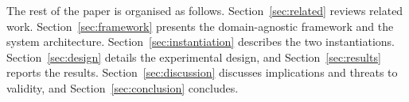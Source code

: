 The rest of the paper is organised as follows. Section~\ref{sec:related}
reviews related work. Section~\ref{sec:framework} presents the
domain-agnostic framework and the system architecture. Section~\ref{sec:instantiation}
describes the two instantiations. Section~\ref{sec:design} details the
experimental design, and Section~\ref{sec:results} reports the results.
Section~\ref{sec:discussion} discusses implications and threats to validity,
and Section~\ref{sec:conclusion} concludes.
